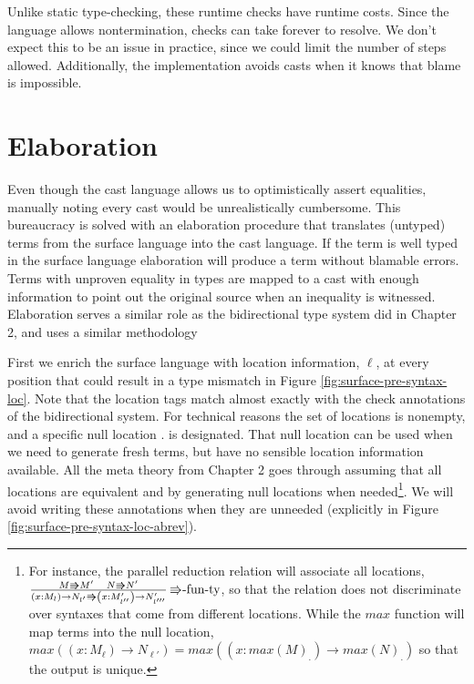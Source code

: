 Unlike static type-checking, these runtime checks have runtime costs.
Since the language allows nontermination, checks can take forever
to resolve. We don't expect this to be an issue in practice, since
we could limit the number of steps allowed. Additionally, the implementation
avoids casts when it knows that blame is impossible. 

\section{Elaboration}

Even though the cast language allows us to optimistically assert equalities,
manually noting every cast would be unrealistically cumbersome. This
bureaucracy is solved with an elaboration procedure that translates
(untyped) terms from the surface language into the cast language.
If the term is well typed in the surface language elaboration will
produce a term without blamable errors. Terms with unproven equality
in types are mapped to a cast with enough information to point out
the original source when an inequality is witnessed. Elaboration serves
a similar role as the bidirectional type system did in Chapter 2,
and uses a similar methodology

First we enrich the surface language with location information, $\ell$,
at every position that could result in a type mismatch in Figure \ref{fig:surface-pre-syntax-loc}.
Note that the location tags match almost exactly
with the check annotations of the bidirectional system. For technical
reasons the set of locations is nonempty, and a specific null location
$.$ is designated. That null location can
be used when we need to generate fresh terms, but have no sensible
location information available. All the meta theory from Chapter 2
goes through assuming that all locations are equivalent and by generating
null locations when needed\footnote{For instance, the parallel reduction relation will associate all locations,
$\frac{M\Rrightarrow M'\quad N\Rrightarrow N'}{\left(x:M_{l}\right)\rightarrow N_{l'}\Rrightarrow\left(x:M'_{l''}\right)\rightarrow N'_{l'''}}\,\textrm{\ensuremath{\Rrightarrow}-fun-ty}$,
so that the relation does not discriminate over syntaxes that come
from different locations. While the $max$ function will map terms
into the null location, $max\left(\left(x:M_{\ensuremath{\ell}}\right)\rightarrow N_{\ensuremath{\ell'}}\right)=max\left(\left(x:max\left(M\right)_{.}\right)\rightarrow max\left(N\right)_{.}\right)$
so that the output is unique.}. We will avoid writing these annotations when
they are unneeded (explicitly in Figure \ref{fig:surface-pre-syntax-loc-abrev}).

